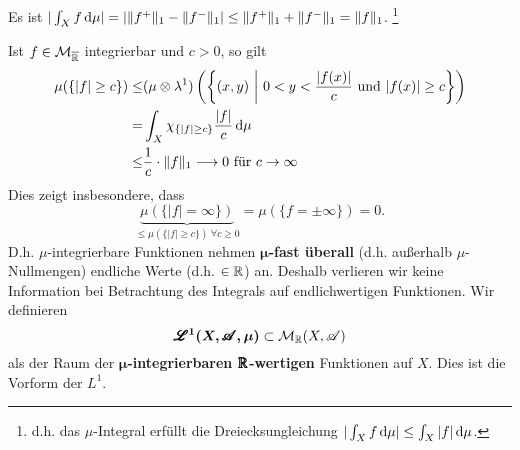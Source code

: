 \begin{beobachtung}
Es ist $|\int_X f\, \mathrm{d} \mu| = | \|f^+\|_1 - \|f^-\|_1|\leq \|f^+\|_1+\|f^-\|_1=\|f\|_1$. \footnote{d.h. das $\mu$-Integral erfüllt die Dreiecksungleichung $|\int_X f\, \mathrm{d}\mu|\leq \int_X |f|\, \mathrm{d}\mu$.}
\end{beobachtung}
Ist $f\in \mathcal{M}_{\overline{\mathbb{R}}}$ integrierbar und $c>0$, so gilt
\begin{equation*}
\begin{split}
\mu (\{|f|\geq c\}) \leq & (\mu \otimes \lambda^1) \left( \left\{ \left(x, y\right)\, \bigg\vert \  0<y<\frac{|f(x)|}{c} \text{ und } |f(x)|\geq c	\right\}\right)\\
= & \int_X \chi_{\{|f|\geq c\}}\frac{|f|}{c}\, \mathrm{d}\mu  \\
\leq & \frac{1}{c}\cdot \|f\|_1 \longrightarrow 0 \text{ für } c\to \infty
\end{split}
\end{equation*}
Dies zeigt insbesondere, dass
$$
\underbrace{\mu( \{   |f|=\infty \} )}_{\leq \mu( \{ |f|\geq c \} ) \ \forall c\geq 0} = \mu(\{  f=\pm \infty  \}) =0.
$$
D.h. $\mu$-integrierbare Funktionen nehmen $\boldsymbol\mu$\textbf{-fast überall} (d.h. außerhalb $\mu$-Nullmengen) endliche Werte (d.h. $\in\mathbb{R}$) an. Deshalb verlieren wir keine Information bei Betrachtung des Integrals auf endlichwertigen Funktionen. Wir definieren
$$\boldsymbol{\pmb{\mathscr{L}}^1 (X,\pmb{\mathscr{A}},\mu)} \subset \mathcal{M}_{\mathbb{R}} (X,\mathscr{A})$$
als der Raum der \textbf{$\boldsymbol\mu$-integrierbaren $\pmb{\mathbb{R}}$-wertigen} Funktionen auf $X$. Dies ist die Vorform der $L^1$.

